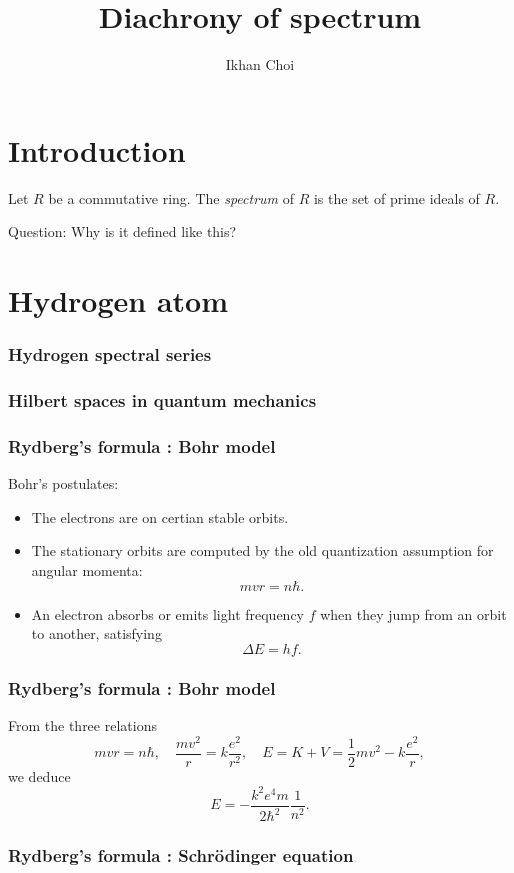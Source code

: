 \documentclass{beamer}
\title{Diachrony of spectrum}
\author{Ikhan Choi}
\begin{document}
\maketitle

\section{Introduction}
\begin{frame}
  \begin{defn}
    Let $R$ be a commutative ring.
    The \emph{spectrum} of $R$ is the set of prime ideals of $R$.
  \end{defn}
  \pause Question: Why is it defined like this?
\end{frame}


\section{Hydrogen atom}
\begin{frame}
\frametitle{Hydrogen spectral series}
\end{frame}

\begin{frame}
\frametitle{Hilbert spaces in quantum mechanics}
\end{frame}

\begin{frame}
\frametitle{Rydberg's formula : Bohr model}
  Bohr's postulates:\pause
  \begin{itemize}[<+->]
    \item The electrons are on certian stable orbits.
    \item The stationary orbits are computed by the old quantization assumption for angular momenta:
    \[mvr=n\hbar.\]
    \item An electron absorbs or emits light frequency $f$ when they jump from an orbit to another, satisfying
    \[\Delta E=hf.\]
  \end{itemize}
\end{frame}

\begin{frame}
\frametitle{Rydberg's formula : Bohr model}
From the three relations
\[mvr=n\hbar,\quad\frac{mv^2}r=k\frac{e^2}{r^2},\quad E=K+V=\frac12mv^2-k\frac{e^2}r,\]
\pause we deduce
\[E=-\frac{k^2e^4m}{2\hbar^2}\frac1{n^2}.\]
\end{frame}

\begin{frame}
\frametitle{Rydberg's formula : Schr\"odinger equation}
\end{frame}
\end{document}

